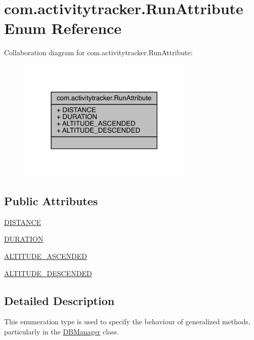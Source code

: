 \hypertarget{enumcom_1_1activitytracker_1_1_run_attribute}{}\section{com.\+activitytracker.\+Run\+Attribute Enum Reference}
\label{enumcom_1_1activitytracker_1_1_run_attribute}


Collaboration diagram for com.\+activitytracker.\+Run\+Attribute\+:
\nopagebreak
\begin{figure}[H]
\begin{center}
\leavevmode
\includegraphics[width=237pt]{enumcom_1_1activitytracker_1_1_run_attribute__coll__graph}
\end{center}
\end{figure}
\subsection*{Public Attributes}
\begin{DoxyCompactItemize}
\item 
\mbox{\hyperlink{enumcom_1_1activitytracker_1_1_run_attribute_a90ee541e68e458a0bb3f5ea45fd46ec0}{D\+I\+S\+T\+A\+N\+CE}}
\item 
\mbox{\hyperlink{enumcom_1_1activitytracker_1_1_run_attribute_a7adf133b2a62f1f99ffc2adfb7097ec9}{D\+U\+R\+A\+T\+I\+ON}}
\item 
\mbox{\hyperlink{enumcom_1_1activitytracker_1_1_run_attribute_abcfe85bf48187d67842a0525c1bcc0af}{A\+L\+T\+I\+T\+U\+D\+E\+\_\+\+A\+S\+C\+E\+N\+D\+ED}}
\item 
\mbox{\hyperlink{enumcom_1_1activitytracker_1_1_run_attribute_a337a68867cfdb8ec7a17c318ad8b216b}{A\+L\+T\+I\+T\+U\+D\+E\+\_\+\+D\+E\+S\+C\+E\+N\+D\+ED}}
\end{DoxyCompactItemize}


\subsection{Detailed Description}
This enumeration type is used to specify the behaviour of generalized methods, particularly in the \mbox{\hyperlink{classcom_1_1activitytracker_1_1_d_b_manager}{D\+B\+Manager}} class. 


